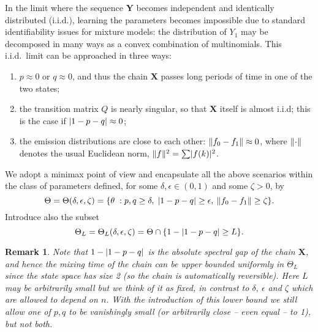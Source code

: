 \documentclass[journal]{IEEEtran}
\newtheorem{remark}{Remark}
\newcommand{\1}{\boldsymbol{1}}
\DeclarePairedDelimiter{\braces}{\{}{\}}
\DeclarePairedDelimiter{\norm}{\lVert}{\rVert}
\DeclarePairedDelimiter{\abs}{\lvert}{\rvert}
\begin{document}
	In the limit where the sequence $\bm{Y}$ becomes independent and identically distributed (i.i.d.), learning the parameters becomes impossible due to standard identifiability issues for mixture models: the distribution of $Y_1$ may be decomposed in many ways as a convex combination of multinomials. This i.i.d.\ limit can be approached in three ways:
	\begin{enumerate}
		\item $p \approx 0$ or $q \approx 0$, and thus the chain
		$\bm{X}$ passes long periods of time in one of the two states;%
		\item the transition matrix $Q$ is nearly singular, so that $\bm{X}$ itself is almost i.i.d; this is the case if $\abs{1 - p - q} \approx
		0$;
		\item the emission distributions are close to each other: $\norm{f_0-f_1}\approx 0$, where $\norm{\cdot}$ denotes the usual Euclidean norm, $\norm{f}^2=\sum \abs{f(k)}^2$.
	\end{enumerate}
	We adopt a minimax point of view and encapsulate all the above scenarios within
	the class of parameters defined, for some $\delta,\epsilon\in (0,1)$ and some $\zeta>0$, by
	\begin{equation*}%
		\Theta=\Theta (\delta,\epsilon, \zeta) =
		\braces{ \theta\;:  p,q \geq\delta,\;\abs{1-p - q} \geq \epsilon,\:\norm{f_{0}-f_{1}} \geq \zeta
		}.
	\end{equation*}
	Introduce also the subset
	\begin{equation*}%
		\Theta_{L} = \Theta_{L}(\delta,\epsilon,\zeta) = \Theta\cap \braces{ 1-\abs{1-p-q}\geq L}.
	\end{equation*}

	\begin{remark}
		Note that $1-\abs{1-p-q}$ is the absolute spectral gap of the chain $\bm{X}$, and hence the mixing time of the chain can be upper bounded uniformly in $\Theta_L$ since the state space has size 2 (so the chain is automatically reversible).
		Here $L$ may be arbitrarily small but we think of it as \emph{fixed}, in contrast to $\delta$, $\epsilon$ and $\zeta$ which are allowed to depend on $n$.
		With the introduction of this lower bound we still allow \emph{one} of $p,q$ to be vanishingly small (or arbitrarily close -- even equal -- to 1), but not both. \end{remark}
\end{document}

